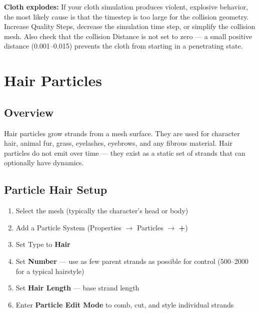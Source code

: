 \begin{warningbox}
\textbf{Cloth explodes:} If your cloth simulation produces violent, explosive behavior, the most likely cause is that the timestep is too large for the collision geometry. Increase Quality Steps, decrease the simulation time step, or simplify the collision mesh. Also check that the collision Distance is not set to zero --- a small positive distance (0.001--0.015) prevents the cloth from starting in a penetrating state.
\end{warningbox}


\section{Hair Particles}
\label{sec:hair}

\subsection{Overview}

Hair particles grow strands from a mesh surface. They are used for character hair, animal fur, grass, eyelashes, eyebrows, and any fibrous material. Hair particles do not emit over time --- they exist as a static set of strands that can optionally have dynamics.

\subsection{Particle Hair Setup}

\begin{enumerate}[leftmargin=2em]
  \item Select the mesh (typically the character's head or body)
  \item Add a Particle System (Properties $\rightarrow$ Particles $\rightarrow$ \textbf{+})
  \item Set Type to \textbf{Hair}
  \item Set \textbf{Number} --- use as few parent strands as possible for control (500--2000 for a typical hairstyle)
  \item Set \textbf{Hair Length} --- base strand length
  \item Enter \textbf{Particle Edit Mode} to comb, cut, and style individual strands
\end{enumerate}

